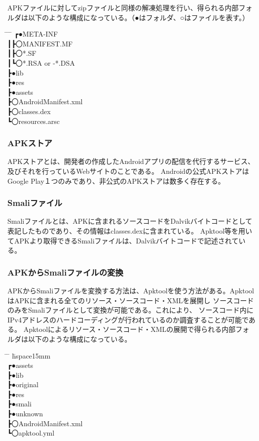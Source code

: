 \documentclass[a4j]{jarticle}
\begin{document}
APKファイルに対してzipファイルと同様の解凍処理を行い、得られる内部フォルダは以下のような構成になっている。（●はフォルダ、○はファイルを表す。）
\begin{tabbing}
 \hspace{8mm} \= \hspace{10mm} \= \hspace{12mm} \= \hspace{15mm} \kill
\>┏●META-INF
\\\>┃\>┣〇MANIFEST.MF
\\\>┃\>┣〇*.SF
\\\>┃\>┗〇*.RSA or -*.DSA
\\\>┣●lib
\\\>┣●res
\\\>┣●assets
\\\>┣〇AndroidManifest.xml
\\\>┣〇classes.dex
\\\>┗〇resources.arsc
\end{tabbing}

\subsubsection{APKストア}
APKストアとは、開発者の作成したAndroidアプリの配信を代行するサービス、及びそれを行っているWebサイトのことである。
Androidの公式APKストアはGoogle Play１つのみであり、非公式のAPKストアは数多く存在する。
\subsubsection{Smaliファイル}
Smaliファイルとは、APKに含まれるソースコードをDalvikバイトコードとして表記したものであり、その情報はclasses.dexに含まれている。
Apktool等を用いてAPKより取得できるSmaliファイルは、Dalvikバイトコードで記述されている。
\subsubsection{APKからSmaliファイルの変換}
APKからSmaliファイルを変換する方法は、Apktoolを使う方法がある。ApktoolはAPKに含まれる全てのリソース・ソースコード・XMLを展開し
ソースコードのみをSmaliファイルとして変換が可能である。これにより、
ソースコード内にIPv4アドレスのハードコーディングが行われているのか調査することが可能である。
Apktoolによるリソース・ソースコード・XMLの展開で得られる内部フォルダは以下のような構成になっている。

\begin{tabbing}
	\hspace{8mm} \= \hspace{10mm} \= \hspace{12mm} \= hspace{15mm} \kill
 \\\>┏●assets
 \\\>┣●lib
 \\\>┣●original
 \\\>┣●res
 \\\>┣●smali
 \\\>┣●unknown
 \\\>┣〇AndroidManifest.xml
 \\\>┗〇apktool.yml
 \end{tabbing}
\end{document}
